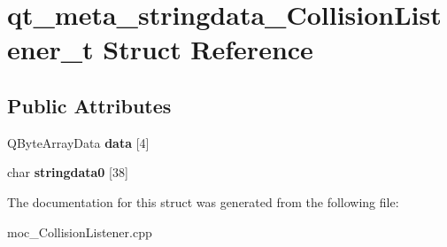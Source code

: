 \hypertarget{structqt__meta__stringdata__CollisionListener__t}{}\section{qt\+\_\+meta\+\_\+stringdata\+\_\+\+Collision\+Listener\+\_\+t Struct Reference}
\label{structqt__meta__stringdata__CollisionListener__t}
\subsection*{Public Attributes}
\begin{DoxyCompactItemize}
\item 
Q\+Byte\+Array\+Data {\bfseries data} \mbox{[}4\mbox{]}\hypertarget{structqt__meta__stringdata__CollisionListener__t_a2fc55762bb9073c96f6b08b7bd892d05}{}\label{structqt__meta__stringdata__CollisionListener__t_a2fc55762bb9073c96f6b08b7bd892d05}

\item 
char {\bfseries stringdata0} \mbox{[}38\mbox{]}\hypertarget{structqt__meta__stringdata__CollisionListener__t_a87776e0ada4783e0e941a8b8282d41f0}{}\label{structqt__meta__stringdata__CollisionListener__t_a87776e0ada4783e0e941a8b8282d41f0}

\end{DoxyCompactItemize}


The documentation for this struct was generated from the following file\+:\begin{DoxyCompactItemize}
\item 
moc\+\_\+\+Collision\+Listener.\+cpp\end{DoxyCompactItemize}
